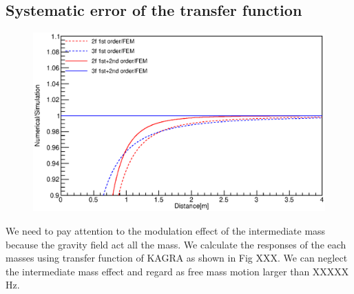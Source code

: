 \documentclass[A4]{spie}  %
\begin{document}
\subsection{Systematic error of the transfer function}
\begin{figure}
\begin{center}
\includegraphics[width=12cm]{dvsx_ratio.eps}
\caption{}
\label{fig:ratio}
\end{center}
\end{figure}

We need to pay attention to the modulation effect of the intermediate mass because the gravity field act all the mass. We calculate the responses of the each masses using transfer function of KAGRA as shown in Fig XXX. We can neglect the intermediate mass effect and regard as free mass motion larger than XXXXX Hz. 
\end{document}
